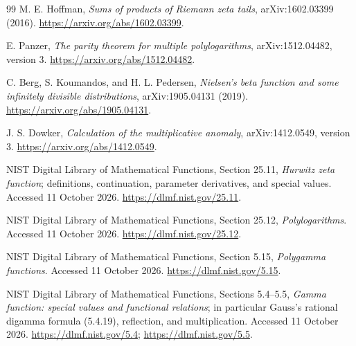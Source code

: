 \begin{thebibliography}{99}
M. E. Hoffman, \emph{Sums of products of Riemann zeta tails},
arXiv:1602.03399 (2016).
\url{https://arxiv.org/abs/1602.03399}.

E. Panzer, \emph{The parity theorem for multiple polylogarithms},
arXiv:1512.04482, version 3.
\url{https://arxiv.org/abs/1512.04482}.

C. Berg, S. Koumandos, and H. L. Pedersen,
\emph{Nielsen's beta function and some infinitely divisible
distributions}, arXiv:1905.04131 (2019).
\url{https://arxiv.org/abs/1905.04131}.

J. S. Dowker, \emph{Calculation of the multiplicative anomaly},
arXiv:1412.0549, version 3.
\url{https://arxiv.org/abs/1412.0549}.

NIST Digital Library of Mathematical Functions, Section 25.11,
\emph{Hurwitz zeta function}; definitions, continuation, parameter
derivatives, and special values. Accessed 11 October 2026.
\url{https://dlmf.nist.gov/25.11}.

NIST Digital Library of Mathematical Functions, Section 25.12,
\emph{Polylogarithms}. Accessed 11 October 2026.
\url{https://dlmf.nist.gov/25.12}.

NIST Digital Library of Mathematical Functions, Section 5.15,
\emph{Polygamma functions}. Accessed 11 October 2026.
\url{https://dlmf.nist.gov/5.15}.

NIST Digital Library of Mathematical Functions, Sections 5.4--5.5,
\emph{Gamma function: special values and functional relations};
in particular Gauss's rational digamma formula (5.4.19), reflection,
and multiplication. Accessed 11 October 2026.
\url{https://dlmf.nist.gov/5.4}; \url{https://dlmf.nist.gov/5.5}.

\end{thebibliography}

